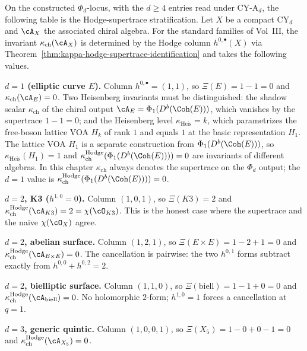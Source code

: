\begin{theorem}
\label{thm:kappa-stratification-by-d}
On the constructed \(\Phi_d\)-locus, with the \(d\geq4\) entries read
under CY-A$_d$, the following table is the Hodge-supertrace
stratification.
Let $X$ be a compact CY$_d$ and $\cA_X$ the associated chiral algebra.
For the standard families of Vol~III, the invariant
$\kappa_{\mathrm{ch}}(\cA_X)$ is determined by the Hodge column
$h^{0,\bullet}(X)$ via
Theorem~\ref{thm:kappa-hodge-supertrace-identification} and takes the
following values.

\textbf{$d = 1$ (elliptic curve $E$).} Column $h^{0,\bullet} = (1, 1)$,
so $\Xi(E) = 1 - 1 = 0$ and $\kappa_{\mathrm{ch}}(\cA_E) = 0$. Two Heisenberg invariants must be
distinguished: the shadow scalar $\kappa_{\mathrm{ch}}$ of the chiral
output $\cA_E = \Phi_1(D^b(\Coh(E)))$, which vanishes by the supertrace
$1 - 1 = 0$; and the Heisenberg level $\kappa_{\mathrm{Heis}} = k$, which
parametrizes the free-boson lattice VOA $H_k$ of rank $1$ and equals $1$
at the basic representation $H_1$. The lattice VOA $H_1$ is a separate
construction from $\Phi_1(D^b(\Coh(E)))$, so $\kappa_{\mathrm{Heis}}(H_1)
= 1$ and $\kappa_{\mathrm{ch}}^{\mathrm{Hodge}}(\Phi_1(D^b(\Coh(E)))) = 0$ are invariants
of different algebras. In this chapter $\kappa_{\mathrm{ch}}$ always
denotes the supertrace on the $\Phi_d$ output; the $d = 1$ value is
$\kappa_{\mathrm{ch}}^{\mathrm{Hodge}}(\Phi_1(D^b(\Coh(E)))) = 0$.

\textbf{$d = 2$, K3 ($h^{1,0} = 0$).} Column $(1, 0, 1)$, so
$\Xi(K3) = 2$ and $\kappa_{\mathrm{ch}}^{\mathrm{Hodge}}(\cA_{K3}) = 2 = \chi(\cO_{K3})$.
This is the honest case where the supertrace and the naive
$\chi(\cO_X)$ agree.

\textbf{$d = 2$, abelian surface.} Column $(1, 2, 1)$, so
$\Xi(E \times E) = 1 - 2 + 1 = 0$ and
$\kappa_{\mathrm{ch}}^{\mathrm{Hodge}}(\cA_{E\times E}) = 0$. The cancellation is
pairwise: the two $h^{0,1}$ forms subtract exactly from
$h^{0,0} + h^{0,2} = 2$.

\textbf{$d = 2$, bielliptic surface.} Column $(1, 1, 0)$, so
$\Xi(\mathrm{biell}) = 1 - 1 + 0 = 0$ and
$\kappa_{\mathrm{ch}}^{\mathrm{Hodge}}(\cA_{\mathrm{biell}}) = 0$. No holomorphic
$2$-form; $h^{1,0} = 1$ forces a cancellation at $q = 1$.

\textbf{$d = 3$, generic quintic.} Column $(1, 0, 0, 1)$, so
$\Xi(X_5) = 1 - 0 + 0 - 1 = 0$ and
$\kappa_{\mathrm{ch}}^{\mathrm{Hodge}}(\cA_{X_5}) = 0$.


\end{theorem}
